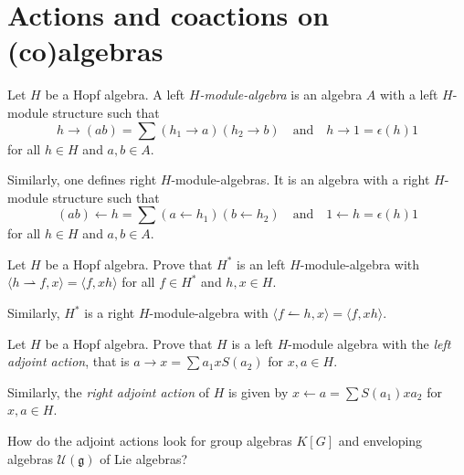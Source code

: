 \documentclass[12pt]{amsproc}
\begin{document}
\section{Actions and coactions on (co)algebras}

\begin{definition}
\label{def:module_algebra}
Let $H$ be a Hopf algebra. A left \emph{$H$-module-algebra} is an algebra
$A$ with a left $H$-module structure such that
\[
h\rightarrow(ab)=\sum (h_{1}\rightarrow a)(h_{2}\rightarrow b)
\quad \text{and}\quad 
h\rightarrow1=\epsilon(h)1
\]
for all $h\in H$ and $a,b\in A$. 
\end{definition}

Similarly, one defines right $H$-module-algebras. It is an
algebra with a right $H$-module structure such that 
\[
(ab)\leftarrow
h=\sum (a\leftarrow h_{1})(b\leftarrow h_{2})
\quad\text{and}\quad 1\leftarrow h=\epsilon(h)1 
\]
for
all $h\in H$ and $a,b\in A$. 

\begin{exercise}
\label{xca:dualH_on_H}
Let $H$ be a Hopf algebra.  Prove that $H^*$ is an left $H$-module-algebra
with  $\langle h\rightharpoonup f,x\rangle=\langle f,xh\rangle$ for all $f\in
H^*$ and $h,x\in H$.  
\end{exercise}

Similarly, $H^*$ is a right $H$-module-algebra
with $\langle f\leftharpoonup h,x\rangle=\langle f,xh\rangle$.

\begin{exercise}
\label{xca:adjoint}
Let $H$ be a Hopf algebra. Prove that $H$ is a left $H$-module algebra with 
the \emph{left
adjoint action}, that is 
$a\rightarrow x=\sum a_{1}xS(a_{2})$
for $x,a\in H$.
\end{exercise}

Similarly, the \emph{right
adjoint action} of $H$ is given by 
$x\leftarrow a=\sum S(a_{1})xa_{2}$ for $x,a\in H$.  

\begin{exercise}
    How do the adjoint actions look for 
    group algebras $K[G]$ and enveloping algebras 
    $\mathcal{U}(\mathfrak{g})$ of Lie algebras? 
\end{exercise}

\end{document}
